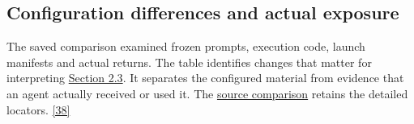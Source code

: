 \subsection[Configuration differences and actual exposure]{\texorpdfstring{\protect\hypertarget{o1}{}Configuration differences and actual exposure}{Configuration differences and actual exposure}}
The saved comparison examined frozen prompts, execution code, launch manifests and actual returns. The table identifies changes that matter for interpreting \href{en.pdf\#section-2-3}{Section 2.3}. It separates the configured material from evidence that an agent actually received or used it. The \href{verification/revision13/abc_version_audit.md}{source comparison} retains the detailed locators. \href{en.pdf\#ref-38}{\mbox{[38]}}

\begingroup\small\setlength{\tabcolsep}{3pt}\renewcommand{\arraystretch}{1.14}
